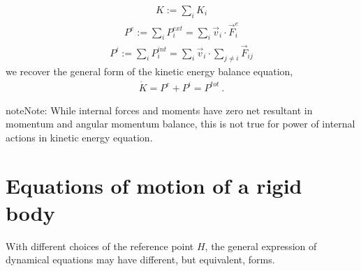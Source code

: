 \documentclass[letterpaper,10pt,english]{jupyterBook}
\begin{document}
\begin{equation*}
\begin{split}K :=  \sum_i K_i\end{split}
\end{equation*}\begin{equation*}
\begin{split}P^e := \sum_i P^{ext}_i = \sum_i \vec{v}_i \cdot  \vec{F}_i^{e} \end{split}
\end{equation*}\begin{equation*}
\begin{split}P^i := \sum_i P^{int}_i = \sum_i \vec{v}_i \cdot \sum_{j \ne i} \vec{F}_{ij}\end{split}
\end{equation*}
\sphinxAtStartPar
we recover the general form of the kinetic energy balance equation,
\begin{equation*}
\begin{split}\dot{K} = P^e + P^i = P^{tot} \ .\end{split}
\end{equation*}
\begin{sphinxadmonition}{note}{Note:}
\sphinxAtStartPar
While internal forces and moments have zero net resultant in momentum and angular momentum balance, this is not true for power of internal actions in kinetic energy equation.
\end{sphinxadmonition}

\sphinxstepscope




\section{Equations of motion of a rigid body}
\label{\detokenize{ch/dynamics-eom-rigid:equations-of-motion-of-a-rigid-body}}\label{\detokenize{ch/dynamics-eom-rigid:classical-mechanics-dynamics-eom-rigid}}\label{\detokenize{ch/dynamics-eom-rigid::doc}}
\sphinxAtStartPar
With different choices of the reference point \(H\), the general expression of dynamical equations may have different, but equivalent, forms.
\end{document}
